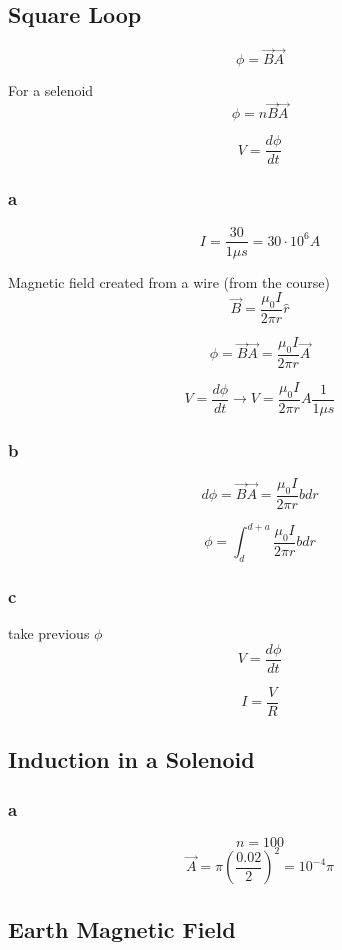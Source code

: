 \subsection{Square Loop}

\[
	\phi = \vec{B} \vec{A}
\]

For a selenoid
\[
	\phi = n \vec{B} \vec{A}
\]

\[
	V = \frac{d \phi}{dt}
\]

\subsubsection{a}

\[
	I = \frac{30}{1 \unit{\mu s}} = 30 \cdot 10^6 \unit{A}
\]

Magnetic field created from a wire (from the course)
\[
	\vec{B} = \frac{\mu_0 I}{2 \pi r} \hat{r}
\]

\[
\phi = \vec{B} \vec{A} = \frac{\mu_0 I}{2 \pi r} \vec{A}
\]

\[
	V = \frac{d \phi}{dt}
	\to V = \frac{\mu_0 I}{2 \pi r} A \frac{1}{1 \unit{\mu s}}
\]

\subsubsection{b}

\[
	d\phi = \vec{B} \vec{A} = \frac{\mu_0 I}{2 \pi r} b dr
\]

\[
	\phi = \int_d^{d + a} \frac{\mu_0 I}{2 \pi r} b dr
\]

\subsubsection{c}

take previous \(\phi\)
\[
	V = \frac{d \phi}{dt}
\]

\[
	I = \frac{V}{R}
\]

\subsection{Induction in a Solenoid}

\subsubsection{a}

\[	n = 100		\]
\[	\vec{A} = \pi (\frac{0.02}{2})^2 = 10^{-4} \pi	\]

\subsection{Earth Magnetic Field}


